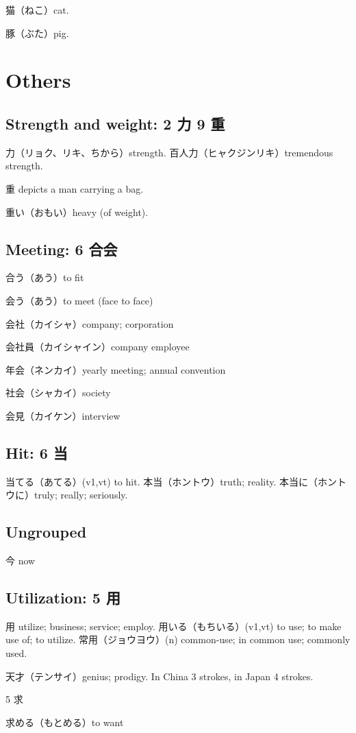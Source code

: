 猫（ねこ）cat.

豚（ぶた）pig.

\section{Others}

\subsection{Strength and weight: 2 力 9 重}

力（リョク、リキ、ちから）strength.
百人力（ヒャクジンリキ）tremendous strength.

重 depicts a man carrying a bag.

重い（おもい）heavy (of weight).

\subsection{Meeting: 6 合会}

合う（あう）to fit

会う（あう）to meet (face to face)

会社（カイシャ）company; corporation

会社員（カイシャイン）company employee

年会（ネンカイ）yearly meeting; annual convention

社会（シャカイ）society

会見（カイケン）interview

\subsection{Hit: 6 当}

当てる（あてる）(v1,vt) to hit.
本当（ホントウ）truth; reality.
本当に（ホントウに）truly; really; seriously.

\subsection{Ungrouped}

今 now

\subsection{Utilization: 5 用}

用 utilize; business; service; employ.
用いる（もちいる）(v1,vt) to use; to make use of; to utilize.
常用（ジョウヨウ）(n) common-use; in common use; commonly used.

天才（テンサイ）genius; prodigy.
In China 3 strokes, in Japan 4 strokes.

5 求

求める（もとめる）to want
